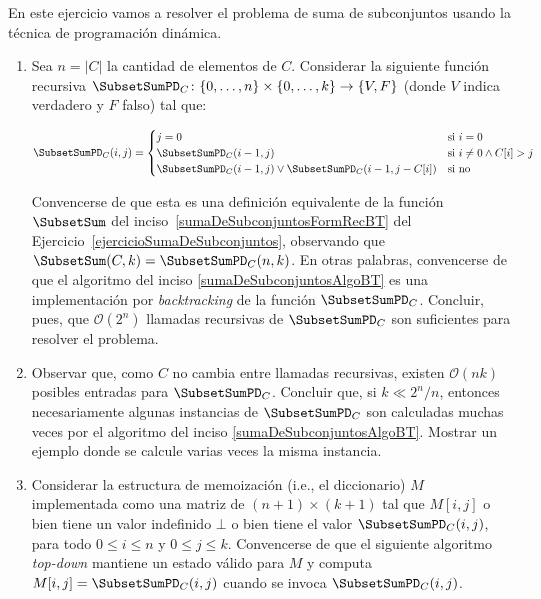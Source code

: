 
\item\label{ej:subset sum dp} En este ejercicio vamos a resolver el problema de suma de subconjuntos usando la técnica de programación dinámica.

 \begin{enumerate}[label=$\alph*)$,ref=$\alph*)$]
  \item\label{ej:subset sum dp:recursion} Sea $n = |C|$ la cantidad de elementos de $C$.  Considerar la siguiente función recursiva $\SubsetSumPD_C \colon \{0,\ldots, n\} \times \{0, \ldots, k\} \to \{V,F\}$ (donde $V$ indica verdadero y $F$ falso) tal que:
  
  
$$
   \SubsetSumPD_C(i, j) = \begin{cases}
    j = 0 & \text{si $i = 0$} \\
    \SubsetSumPD_C(i-1,j) & \text{si $i \neq 0 \land C[i] > j$} \\
    \SubsetSumPD_C(i-1, j) \lor \SubsetSumPD_C(i-1, j- C[i]) & \text{si no}
   \end{cases}
$$
  
  
  Convencerse de que esta es una definición equivalente de la función $\SubsetSum$ del inciso~\ref{sumaDeSubconjuntosFormRecBT} del Ejercicio~\ref{ejercicioSumaDeSubconjuntos}, observando que $\SubsetSum(C, k) = \SubsetSumPD_C(n, k)$.  En otras palabras, convencerse de que el algoritmo del inciso \ref{sumaDeSubconjuntosAlgoBT} es una implementación por \textit{backtracking} de la función $\SubsetSumPD_C$.  Concluir, pues, que $\mathcal{O}(2^n)$ llamadas recursivas de $\SubsetSumPD_C$ son suficientes para resolver el problema.
  \item Observar que, como $C$ no cambia entre llamadas recursivas, existen $\mathcal{O}(nk)$ posibles entradas para $\SubsetSumPD_C$. Concluir que, si $k \ll 2^n/n$, entonces necesariamente algunas instancias de $\SubsetSumPD_C$ son calculadas muchas veces por el algoritmo del inciso \ref{sumaDeSubconjuntosAlgoBT}. Mostrar un ejemplo donde se calcule varias veces la misma instancia.
  \item Considerar la estructura de memoización (i.e., el diccionario) $M$ implementada como una matriz de $(n+1) \times (k+1)$ tal que $M[i,j]$ o bien tiene un valor indefinido $\bot$ o bien tiene el valor $\SubsetSumPD_C(i, j)$, para todo $0 \leq i \leq n$ y $0 \leq j \leq k$.  Convencerse de que el siguiente algoritmo \emph{top-down} mantiene un estado válido para $M$ y computa $M[i, j] = \SubsetSumPD_C(i, j)$ cuando se invoca $\SubsetSumPD_C(i, j)$.


\end{enumerate}
